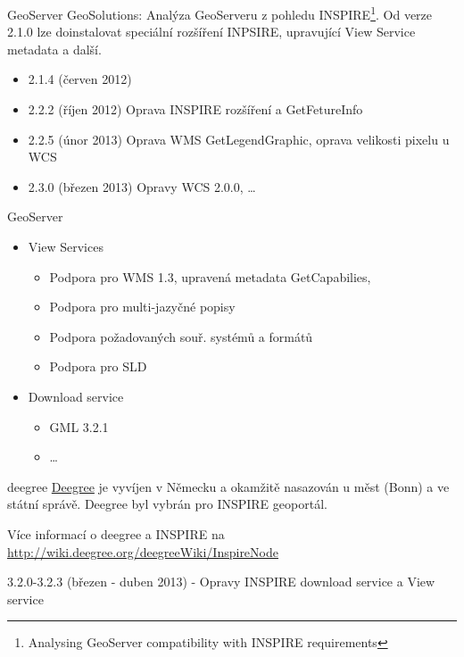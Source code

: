 \documentclass{beamer}
\begin{document}
\begin{frame}{GeoServer}
    GeoSolutions: Analýza GeoServeru z pohledu
    INSPIRE\footnote{{Analysing GeoServer compatibility with INSPIRE requirements}}.
Od verze 2.1.0 lze doinstalovat speciální rozšíření INPSIRE, upravující View
Service metadata a další.
    \begin{itemize}
        \item 2.1.4 (červen 2012)
            \pause
        \item 2.2.2 (říjen 2012) Oprava INSPIRE rozšíření a GetFetureInfo
            \pause
        \item 2.2.5 (únor 2013) Oprava WMS GetLegendGraphic, oprava velikosti
        pixelu u WCS
            \pause
        \item 2.3.0 (březen 2013) Opravy WCS 2.0.0, \dots
    \end{itemize}
\end{frame}

\begin{frame}{GeoServer}
\begin{itemize}
    \item View Services
        \begin{itemize}
            \item Podpora pro WMS 1.3, upravená metadata GetCapabilies, 
            \item Podpora pro multi-jazyčné popisy
            \item Podpora požadovaných souř. systémů a formátů
            \item Podpora pro SLD
        \end{itemize}
    \pause
    \item Download service
        \begin{itemize}
        \item GML 3.2.1
            \item \dots
        \end{itemize}
\end{itemize}
\end{frame}

\begin{frame}{deegree}
\href{http://deegree.org}{Deegree} je vyvíjen v Německu a okamžitě nasazován u měst (Bonn) a ve státní
správě. Deegree byl vybrán pro INSPIRE geoportál.

Více informací o deegree a INSPIRE na
\url{http://wiki.deegree.org/deegreeWiki/InspireNode}

3.2.0-3.2.3 (březen - duben 2013) - Opravy INSPIRE download service a View service
\end{frame}
\end{document}
